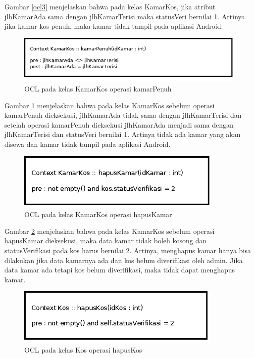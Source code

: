 	Gambar \ref{ocl3} menjelaskan bahwa pada kelas KamarKos, jika atribut jlhKamarAda sama dengan jlhKamarTerisi maka statusVeri bernilai 1. Artinya jika kamar kos penuh, maka kamar tidak tampil pada aplikasi Android.
	
	\begin{figure}[H]
		\centering
		\includegraphics[scale=0.5]{gambar/ocl/kamarPenuh}
		\caption{OCL pada kelas KamarKos operasi kamarPenuh}
		\label{ocl4}
	\end{figure}
	
	Gambar \ref{ocl4} menjelaskan bahwa pada kelas KamarKos sebelum operasi kamarPenuh dieksekusi, jlhKamarAda tidak sama dengan jlhKamarTerisi dan setelah operasi kamarPenuh dieksekusi jlhKamarAda menjadi sama dengan jlhKamarTerisi dan statusVeri bernilai 1. Artinya tidak ada kamar yang akan disewa dan kamar tidak tampil pada aplikasi Android. 
	
	\begin{figure}[H]
		\centering
		\includegraphics[scale=0.7]{gambar/ocl/hapuskamar}
		\caption{OCL pada kelas KamarKos operasi hapusKamar}
		\label{ocl5}
	\end{figure}
	
	Gambar \ref{ocl5} menjelaskan bahwa pada kelas KamarKos sebelum operasi hapusKamar dieksekusi, maka data kamar tidak boleh kosong dan statusVerifikasi pada kos harus bernilai 2. Artinya, menghapus kamar hanya bisa dilakukan jika data kamarnya ada dan kos belum diverifikasi oleh admin. Jika data kamar ada tetapi kos belum diverifikasi, maka tidak dapat menghapus kamar.
	
	\begin{figure}[H]
		\centering
		\includegraphics[scale=0.8]{gambar/ocl/hapusKos}
		\caption{OCL pada kelas Kos operasi hapusKos}
		\label{ocl6}
	\end{figure} 
	
